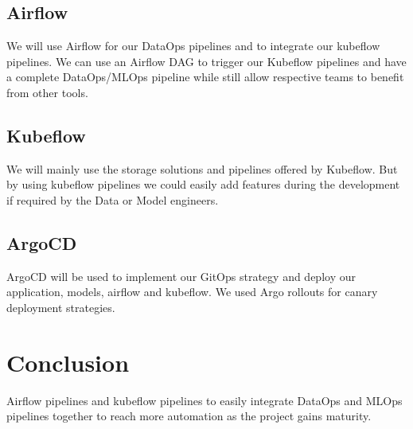 \subsection{Airflow}\label{subsec:airflow}
We will use Airflow for our DataOps pipelines and to integrate our kubeflow pipelines.
We can use an Airflow DAG to trigger our Kubeflow pipelines and have a complete DataOps/MLOps pipeline while still allow respective teams
to benefit from other tools.

\subsection{Kubeflow}\label{subsec:kubeflow}
We will mainly use the storage solutions and pipelines offered by Kubeflow.
But by using kubeflow pipelines we could easily add features during the development if required by the Data or Model engineers.

\subsection{ArgoCD}\label{subsec:argocd}
ArgoCD will be used to implement our GitOps strategy and deploy our application, models, airflow and kubeflow.
We used Argo rollouts for canary deployment strategies.






\section{Conclusion}\label{sec:conclusion}
Airflow pipelines and kubeflow pipelines to easily integrate DataOps and MLOps pipelines together to reach more automation as the project gains maturity.
